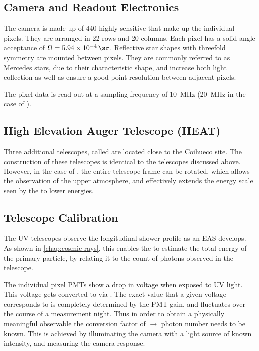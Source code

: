 \subsection{Camera and Readout Electronics}

The camera is made up of 440 highly sensitive \PMTs that make up the individual
pixels. They are arranged in 22 rows and 20 columns. Each pixel has a solid angle 
acceptance of $\Omega = \SI{5.94e-4}{\sr}$. Reflective star shapes with threefold 
symmetry are mounted between pixels. They are commonly referred to as Mercedes 
stars, due to their characteristic shape, and increase both light collection as 
well as ensure a good point resolution between adjacent pixels.

The pixel data is read out at a sampling frequency of \SI{10}{\mega\hertz} 
(\SI{20}{\mega\hertz} in the case of \HE). 


\subsection{High Elevation Auger Telescope (HEAT)}
\label{ssec:heat}

Three additional telescopes, called \HEs are located close to the Coihueco site.
The construction of these telescopes is identical to the telescopes discussed
above. However, in the case of \HE, the entire telescope frame can be rotated,
which allows the observation of the upper atmosphere, and effectively extends the 
energy scale seen by the \FD to lower energies.


\subsection{Telescope Calibration}
\label{ssec:fd-calibration}

The UV-telescopes observe the longitudinal shower profile as an EAS develops. As 
shown in \autoref{chap:cosmic-rays}, this enables the \FD to estimate the total 
energy of the primary particle, by relating it to the count of photons observed 
in the telescope.

The individual pixel PMTs show a drop  in voltage when exposed to UV light. This
voltage gets converted to \ADC via . The exact \ADC value that a 
given voltage corresponds to is completely determined by the PMT gain, and
fluctuates over the course of a measurement night. Thus in order to obtain a 
physically meaningful observable the conversion factor of \ADC $\rightarrow$ 
photon number needs to be known. This is achieved by illuminating the \FD camera 
with a light source of known intensity, and measuring the camera response. 

